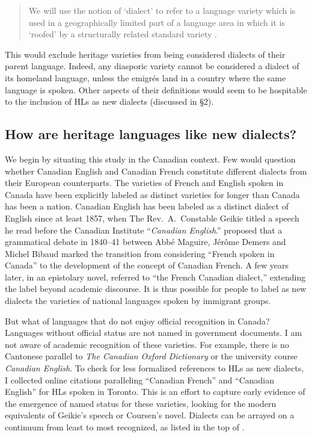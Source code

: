 \documentclass[output=paper]{LSP/langsci}
\begin{document}
\begin{quote}
We will use the notion of ‘dialect’ to refer to a language variety which is used in a geographically limited part of a language area in which it is ‘roofed’ by a structurally related standard variety \citep[1]{auer_study_2004}.
\end{quote}

This would exclude heritage varieties from being considered dialects of their parent language. Indeed, any diasporic variety cannot be considered a dialect of its homeland language, unless the emigrés land in a country where the same language is spoken. Other aspects of their definitions would seem to be hospitable to the inclusion of HLs as new dialects (discussed in §2). 

\subsection{How are heritage languages like new dialects?}
We begin by situating this study in the Canadian context. Few would question whether Canadian English and Canadian French constitute different dialects from their European counterparts. The varieties of French and English spoken in Canada have been explicitly labeled as distinct varieties for longer than Canada has been a nation. Canadian English has been labeled as a distinct dialect of English since at least 1857, when The Rev.\ A.\ Constable Geikie titled a speech he read before the Canadian Institute “\textit{Canadian English}.” \citet{bouchard_langue_1998} proposed that a grammatical debate in 1840--41 between Abbé Maguire, Jérôme Demers and Michel Bibaud marked the transition from considering “French spoken in Canada” to the development of the concept of Canadian French. A few years later, in an epistolary novel, \citet{coursen_it_1846} referred to “the French Canadian dialect,” extending the label beyond academic discourse. It is thus possible for people to label as new dialects the varieties of national languages spoken by immigrant groups. 

But what of languages that do not enjoy official recognition in Canada? Languages without official status are not named in government documents. I am not aware of academic recognition of these varieties. For example, there is no Cantonese parallel to \textit{The Canadian Oxford Dictionary} or the university course \textit{Canadian English}. To check for less formalized references to HLs as new dialects, I collected online citations paralleling “Canadian French” and “Canadian English” for HLs spoken in Toronto. This is an effort to capture early evidence of the emergence of named status for these varieties, looking for the modern equivalents of Geikie’s speech or Coursen’s novel. Dialects can be arrayed on a continuum from least to most recognized, as listed in the top of .
\end{document}
